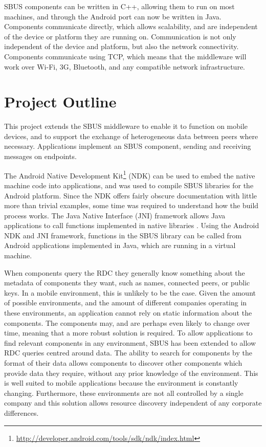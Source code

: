 \documentclass[12pt,twoside,notitlepage]{report}
\begin{document}
SBUS components can be written in C++, allowing them to run on most machines, and through the Android port can now be written in Java. 
Components communicate directly, which allows scalability, and are independent of the device or platform they are running on. 
Communication is not only independent of the device and platform, but also the network connectivity. 
Components communicate using TCP, which means that the middleware will work over Wi-Fi, 3G, Bluetooth, and any compatible network infrastructure. 

\section{Project Outline}

This project extends the SBUS middleware to enable it to function on mobile devices, and to support the exchange of heterogeneous data between peers where necessary. 
Applications implement an SBUS component, sending and receiving messages on endpoints. 

The Android Native Development Kit\footnote{\url{http://developer.android.com/tools/sdk/ndk/index.html}} (NDK) can be used to embed the native machine code into applications, and was used to compile SBUS libraries for the Android platform. 
Since the NDK offers fairly obscure documentation with little more than trivial examples, some time was required to understand how the build process works. 
The Java Native Interface (JNI) framework allows Java applications to call functions implemented in native libraries \cite{liang1999java}. 
Using the Android NDK and JNI framework, functions in the SBUS library can be called from Android applications implemented in Java, which are running in a virtual machine. 

When components query the RDC they generally know something about the metadata of components they want, such as names, connected peers, or public keys. 
In a mobile environment, this is unlikely to be the case. 
Given the amount of possible environments, and the amount of different companies operating in these environments, an application cannot rely on static information about the components. 
The components may, and are perhaps even likely to change over time, meaning that a more robust solution is required. 
To allow applications to find relevant components in any environment, SBUS has been extended to allow RDC queries centred around data. 
The ability to search for components by the format of their data allows components to discover other components which provide data they require, without any prior knowledge of the environment. 
This is well suited to mobile applications because the environment is constantly changing. 
Furthermore, these environments are not all controlled by a single company and this solution allows resource discovery independent of any corporate differences. 
\end{document}

